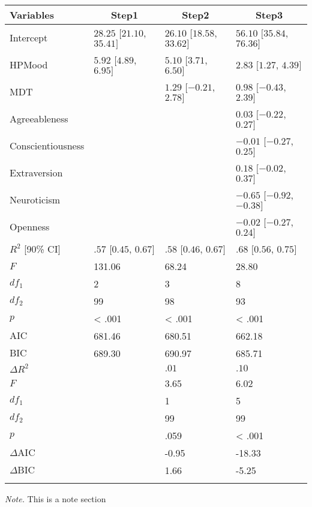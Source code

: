 \documentclass[man,floatsintext]{apa6}
\begin{document}
\begin{table}[tbp]
\begin{center}
\begin{threeparttable}
\caption{\label{tab:unnamed-chunk-1}}
\small{
\begin{tabular}{llll}
\toprule
Variables & \multicolumn{1}{c}{Step1} & \multicolumn{1}{c}{Step2} & \multicolumn{1}{c}{Step3}\\
\midrule
Intercept & $28.25$ $[21.10$, $35.41]$ & $26.10$ $[18.58$, $33.62]$ & $56.10$ $[35.84$, $76.36]$\\
HPMood & $5.92$ $[4.89$, $6.95]$ & $5.10$ $[3.71$, $6.50]$ & $2.83$ $[1.27$, $4.39]$\\
MDT &  & $1.29$ $[-0.21$, $2.78]$ & $0.98$ $[-0.43$, $2.39]$\\
Agreeableness &  &  & $0.03$ $[-0.22$, $0.27]$\\
Conscientiousness &  &  & $-0.01$ $[-0.27$, $0.25]$\\
Extraversion &  &  & $0.18$ $[-0.02$, $0.37]$\\
Neuroticism &  &  & $-0.65$ $[-0.92$, $-0.38]$\\
Openness &  &  & $-0.02$ $[-0.27$, $0.24]$\\
$R^2$ [90\% CI] & $.57$ $[0.45$, $0.67]$ & $.58$ $[0.46$, $0.67]$ & $.68$ $[0.56$, $0.75]$\\
$F$ & 131.06 & 68.24 & 28.80\\
$df_1$ & 2 & 3 & 8\\
$df_2$ & 99 & 98 & 93\\
$p$ & < .001 & < .001 & < .001\\
$\mathrm{AIC}$ & 681.46 & 680.51 & 662.18\\
$\mathrm{BIC}$ & 689.30 & 690.97 & 685.71\\
$\Delta R^2$ &  & $.01$ & $.10$\\
$F$ &  & 3.65 & 6.02\\
$df_1$ &  & 1 & 5\\
$df_2$ &  & 99 & 99\\
$p$ &  & .059 & < .001\\
$\Delta \mathrm{AIC}$ &  & -0.95 & -18.33\\
$\Delta \mathrm{BIC}$ &  & 1.66 & -5.25\\
\bottomrule
\addlinespace
\end{tabular}
}
\begin{tablenotes}[para]
\normalsize{\textit{Note.} This is a note section}
\end{tablenotes}
\end{threeparttable}
\end{center}
\end{table}
\end{document}
